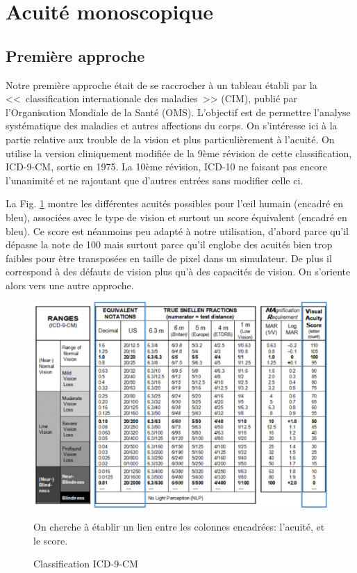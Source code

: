 	\section{Acuité monoscopique}
	
	\subsection{Première approche}	
	\par Notre première approche était de se raccrocher à un tableau établi par la <<~classification internationale des maladies~>> (CIM), publié par l'Organisation Mondiale de la Santé (OMS). L'objectif est de permettre l'analyse systématique des maladies et autres affections du corps. On s'intéresse ici à la partie relative aux trouble de la vision et plus particulièrement à l'acuité. On utilise la version cliniquement modifiée de la 9ème révision de cette classification, ICD-9-CM, sortie en 1975. La 10ème révision, ICD-10 ne faisant pas encore l'unanimité et ne rajoutant que d'autres entrées sans modifier celle ci.
	
	\par La Fig. \ref{fig:icd_9_cdm} montre les différentes acuités possibles pour l'œil humain (encadré en bleu), associées avec le type de vision et surtout un score équivalent (encadré en bleu). Ce score est néanmoins peu adapté à notre utilisation, d'abord parce qu'il dépasse la note de 100 mais surtout parce qu'il englobe des acuités bien trop faibles pour être transposées en taille de pixel dans un simulateur. De plus il correspond à des défauts de vision plus qu'à des capacités de vision. On s'oriente alors vers une autre approche.
	
	\begin{figure}[h]
		\centering
		\includegraphics[scale=.6]{Figures/AcuityICD9CM}
		\caption{Classification ICD-9-CM}{On cherche à établir un lien entre les colonnes encadrées: l'acuité, et le score.}
		\label{fig:icd_9_cdm}
	\end{figure}
	
